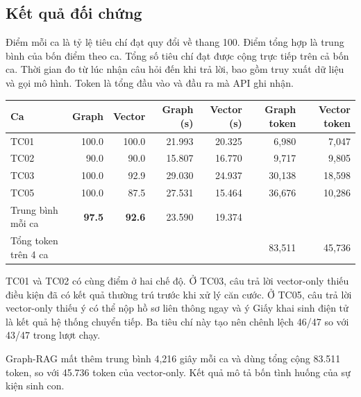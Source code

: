 \documentclass[11pt,a4paper]{article}
\begin{document}
\subsection{Kết quả đối chứng}

Điểm mỗi ca là tỷ lệ tiêu chí đạt quy đổi về thang 100. Điểm tổng hợp là trung bình của bốn điểm theo ca. Tổng số tiêu chí đạt được cộng trực tiếp trên cả bốn ca. Thời gian đo từ lúc nhận câu hỏi đến khi trả lời, bao gồm truy xuất dữ liệu và gọi mô hình. Token là tổng đầu vào và đầu ra mà API ghi nhận.

\begin{center}
\begin{tabular}{lrrrrrr}
\toprule
Ca & Graph & Vector & Graph (s) & Vector (s) & Graph token & Vector token\\
\midrule
TC01 & 100.0 & 100.0 & 21.993 & 20.325 & 6,980 & 7,047\\
TC02 & 90.0 & 90.0 & 15.807 & 16.770 & 9,717 & 9,805\\
TC03 & 100.0 & 92.9 & 29.030 & 24.937 & 30,138 & 18,598\\
TC05 & 100.0 & 87.5 & 27.531 & 15.464 & 36,676 & 10,286\\
\midrule
Trung bình mỗi ca & \textbf{97.5} & \textbf{92.6} & 23.590 & 19.374 & & \\
Tổng token trên 4 ca & & & & & 83,511 & 45,736\\
\bottomrule
\end{tabular}
\end{center}

TC01 và TC02 có cùng điểm ở hai chế độ. Ở TC03, câu trả lời vector-only thiếu điều kiện đã có kết quả thường trú trước khi xử lý căn cước. Ở TC05, câu trả lời vector-only thiếu ý có thể nộp hồ sơ liên thông ngay và ý Giấy khai sinh điện tử là kết quả hệ thống chuyển tiếp. Ba tiêu chí này tạo nên chênh lệch 46/47 so với 43/47 trong lượt chạy.

Graph-RAG mất thêm trung bình 4,216 giây mỗi ca và dùng tổng cộng 83.511 token, so với 45.736 token của vector-only. Kết quả mô tả bốn tình huống của sự kiện sinh con. 
\end{document}
